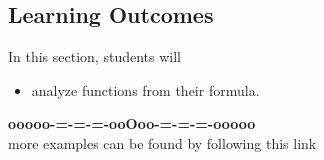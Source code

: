 \documentclass{ximera}
\begin{document}
\subsection*{Learning Outcomes}

\begin{sectionOutcomes}
In this section, students will 

\begin{itemize}
\item analyze functions from their formula.
\end{itemize}
\end{sectionOutcomes}










\begin{center}
\textbf{\textcolor{green!50!black}{ooooo-=-=-=-ooOoo-=-=-=-ooooo}} \\

more examples can be found by following this link\\ 

\end{center}
\end{document}
